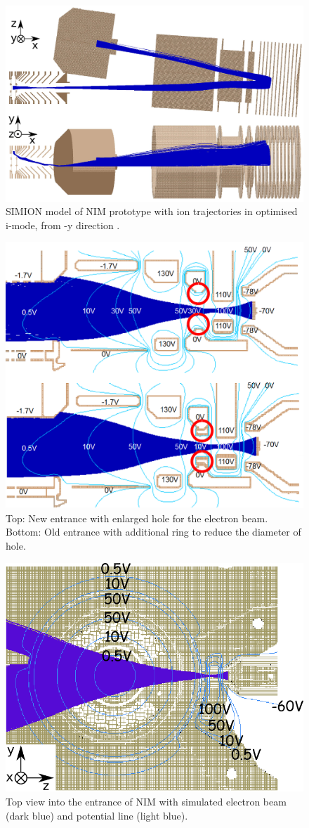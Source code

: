 	\begin{figure}[h] %
		\centering
		\includegraphics[width=.8\textwidth]{Experiments/Ionflys_imode.png}
		\caption{SIMION model of NIM prototype with ion trajectories in optimised i-mode, from -y direction \cite{Diss_Meyer}.}
		\label{fig:iModeIonFlyStefan}
	\end{figure}
	\begin{figure}[h!] %
		\centering
		\includegraphics[width=.7\textwidth]{Experiments/IS_adaption.png}
		\caption{Top: New entrance with enlarged hole for the electron beam. Bottom: Old entrance with additional ring to reduce the diameter of hole.}
		\label{fig:IsAdapt}
	\end{figure}
	\begin{figure}[h]
		\centering
		\includegraphics[width=.5\textwidth]{Experiments/IS_adaption_TopView.png}
		\caption{Top view into the entrance of NIM with simulated electron beam (dark blue) and potential line (light blue).}
		\label{fig:IsAdaptTop}
	\end{figure}
